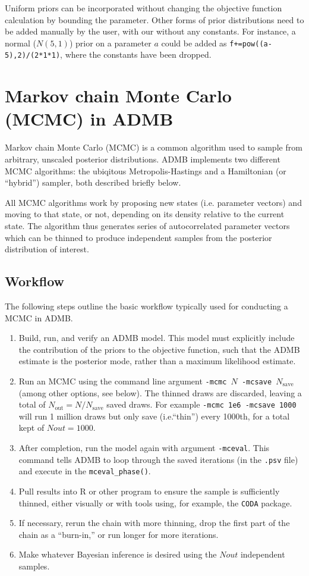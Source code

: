 \documentclass{article}\usepackage[]{graphicx}\usepackage[]{color}
\begin{document}
Uniform priors can be incorporated without changing the
objective function calculation by bounding the
parameter. Other forms of prior distributions need to be
added manually by the user, with our without any
constants. For instance, a normal ($N(5,1)$) prior on a
parameter $a$ could be added as
\texttt{f+=pow((a-5),2)/(2*1*1)}, where the constants have
been dropped.

\section{Markov chain Monte Carlo (MCMC) in ADMB}
Markov chain Monte Carlo (MCMC) is a common algorithm used
to sample from arbitrary, unscaled posterior
distributions. ADMB implements two different MCMC
algorithms: the ubiqitous Metropolis-Hastings and a
Hamiltonian (or ``hybrid'') sampler, both described briefly
below.

All MCMC algorithms work by proposing new states
(i.e. parameter vectors) and moving to that state, or not,
depending on its density relative to the current state. The
algorithm thus generates series of autocorrelated parameter
vectors which can be thinned to produce independent samples
from the posterior distribution of interest.

\subsection{Workflow}
The following steps outline the basic workflow typically
used for conducting a MCMC in ADMB.
\begin{enumerate}
\item Build, run, and verify an ADMB model. This model must
  explicitly include the contribution of the priors to the
  objective function, such that the ADMB estimate is the
  posterior mode, rather than a maximum likelihood estimate.
\item Run an MCMC using the command line argument
  \texttt{-mcmc $N$ -mcsave $N_{\text{save}}$} (among other
  options, see below). The thinned draws are discarded,
  leaving a total of $N_{\text{out}}=N/N_{\text{save}}$
  saved draws. For example \texttt{-mcmc 1e6 -mcsave 1000}
  will run 1 million draws but only save (i.e.``thin'')
  every 1000th, for a total kept of $Nout=1000$.
\item After completion, run the model again with argument
  \texttt{-mceval}. This command tells ADMB to loop through
  the saved iterations (in the \texttt{.psv} file) and
  execute in the \texttt{mceval\_phase()}.
\item Pull results into R or other program to ensure the
  sample is sufficiently thinned, either visually or with
  tools using, for example, the \texttt{CODA} package.
\item If necessary, rerun the chain with more thinning, drop
  the first part of the chain as a ``burn-in,'' or run
  longer for more iterations.
\item Make whatever Bayesian inference is desired using the
  $Nout$ independent samples.
\end{enumerate}
\end{document}
